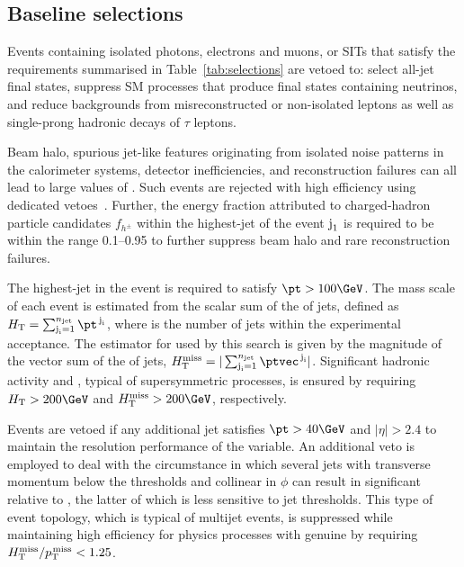 \subsection{Baseline selections}
\label{sec:baseline}

Events containing isolated photons, electrons and muons, or SITs that
satisfy the requirements summarised in Table~\ref{tab:selections} are
vetoed to: select all-jet final states, suppress SM processes that
produce final states containing neutrinos, and reduce backgrounds from
misreconstructed or non-isolated leptons as well as single-prong
hadronic decays of $\tau$ leptons.

Beam halo, spurious jet-like features originating from isolated noise
patterns in the calorimeter systems, detector inefficiencies, and
reconstruction failures can all lead to large values of \ptmiss. Such
events are rejected with high efficiency using dedicated
vetoes~\cite{CMS-PAS-JME-16-004, Khachatryan:2014gga}. Further, the
energy fraction attributed to charged-hadron particle candidates
$f_{h^{\pm}}$ within the highest-\pt jet of the event $\text{j}_\text{1}$ is
required to be within the range 0.1--0.95 to further suppress beam
halo and rare reconstruction failures.

The highest-\pt jet in the event is required to satisfy $\pt >
100\GeV$. The mass scale of each event is estimated from the scalar
sum of the \pt of jets, defined as $\scalht = \sum_{\jet{i} =
  1}^{\njet} \pt^{\,\jet{i}}$, where \njet is the number of jets
within the experimental acceptance. The estimator for \ptvecmiss used
by this search is given by the magnitude of the vector sum of the \pt
of jets, $\mht = |\sum_{\jet{i} = 1}^{\njet}
\ptvec^{\,\jet{i}}|$. Significant hadronic activity and \ptvecmiss,
typical of supersymmetric processes, is ensured by requiring $\scalht
> 200\GeV$ and $\mht > 200\GeV$, respectively.

Events are vetoed if any additional jet satisfies $\pt > 40\GeV$ and
$|\eta| > 2.4$ to maintain the resolution performance of the \mht
variable. An additional veto is employed to deal with the circumstance
in which several jets with transverse momentum below the \pt
thresholds and collinear in $\phi$ can result in significant \mht
relative to \ptmiss, the latter of which is less sensitive to jet
thresholds. This type of event topology, which is typical of multijet
events, is suppressed while maintaining high efficiency for physics
processes with genuine \ptvecmiss by requiring $H_{\text{T}}^{\text{miss}} / p_{\text{T}}^{\kern1pt\text{miss}} < 1.25$.


